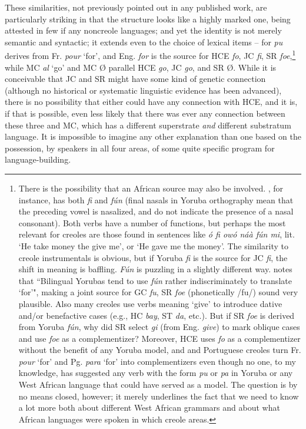 These similarities, not previously pointed out in any published work, are particularly striking in that the structure looks like a highly marked one, being attested in few if any noncreole languages; and yet the identity is not merely semantic and syntactic; it extends even to the choice of lexical items -- for \textit{pu} derives from Fr. \textit{pour} `for', and Eng. \textit{for} is the source for HCE \textit{fo}, JC \textit{fi}, SR \textit{foe},\footnote{There is the possibility that an African source may also be involved. , for instance, has both \textit{fi} and \textit{f{\'u}n} (final nasals in Yoruba orthography mean that the preceding vowel is nasalized, and do not indicate the presence of a nasal consonant). Both verbs have a number of functions, but perhaps the most relevant for creoles are those found in sentences like \textit{{\'o} fi ow{\'o} n\'a\`a f\'un mi}, lit. `He take money the give me', or `He gave me the money'. The similarity to creole instrumentals is obvious, but if Yoruba \textit{fi} is the source for JC \textit{fi}, the shift in meaning is baffling. \textit{F\'un} is puzzling in a slightly different way. \citet{Rowlands1969} notes that ``Bilingual Yorubas tend to use \textit{f\'un} rather indiscriminately to translate `for'", making a joint source for GC \textit{fu}, SR \textit{foe} (phonetically /fu/) sound very plausible. Also many creoles use %
verbs meaning `give' to introduce dative and/or benefactive cases (e.g., HC \textit{bay}, ST \textit{da}, etc.). But if SR \textit{foe} is derived from Yoruba \textit{f\'un}, why did SR select \textit{gi} (from Eng. \textit{give}) to mark oblique cases and use \textit{foe} as a complementizer? Moreover, HCE uses \textit{fo} as a complementizer without the benefit of any Yoruba model, and  and Portuguese creoles turn Fr. \textit{pour} `for' and Pg. \textit{para} `for' into complementizers even though no one, to my knowledge, has suggested any verb with the form \textit{pu} or \textit{pa} in Yoruba or any West African language that could have served as a model. The question is by no means closed, however; it merely underlines the fact that we need to know a lot more both about different West African grammars and about what African lan\-guages were spoken in which creole areas.} while MC \textit{al} `go' and MC {\O} parallel HCE \textit{go}, JC \textit{go}, and SR {\O}. While it is conceivable that JC and SR might have some kind of genetic connection (although no historical or systematic linguistic evidence has been advanced), there is no possi\-bility that either could have any connection with HCE, and it is, if that is possible, even less likely that there was ever any connection between these three and MC, which has a different superstrate \textit{and} different substratum language. It is impossible to imagine any other
explanation than one based on the possession, by speakers in all four areas, of some quite specific program for language-building.

